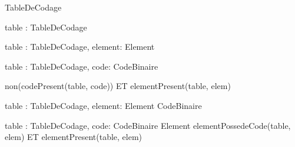 \begin{algorithme}

		{}{TableDeCodage}{}

		{table : TableDeCodage}{\booleen}{}

		{table : TableDeCodage, element: Element}{\booleen}{}

		{table : TableDeCodage, code: CodeBinaire }{\booleen}{}

		{}
		{non(codePresent(table, code)) ET elementPresent(table, elem)}

		{table : TableDeCodage, element: Element }{CodeBinaire}{}

		{table : TableDeCodage, code: CodeBinaire }{Element}
		{elementPossedeCode(table, elem) ET elementPresent(table, elem)}
	
\end{algorithme}